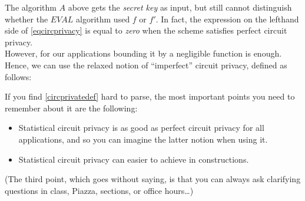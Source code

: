 The algorithm \(A\) above gets the \emph{secret key} as input, but still
cannot distinguish whether the \(\ensuremath{\mathit{EVAL}}\) algorithm
used \(f\) or \(f'\). In fact, the expression on the lefthand side of
\eqref{eqcircprivacy} is equal to \emph{zero} when the scheme satisfies
perfect circuit privacy.\\
However, for our applications bounding it by a negligible function is
enough. Hence, we can use the relaxed notion of ``imperfect'' circuit
privacy, defined as follows:

\hypertarget{circprivatedef}{}

If you find \cref{circprivatedef} hard to parse, the most important
points you need to remember about it are the following:

\begin{itemize}
\item
  Statistical circuit privacy is as good as perfect circuit privacy for
  all applications, and so you can imagine the latter notion when using
  it.
\item
  Statistical circuit privacy can easier to achieve in constructions.
\end{itemize}

(The third point, which goes without saying, is that you can always ask
clarifying questions in class, Piazza, sections, or office hours\ldots)

